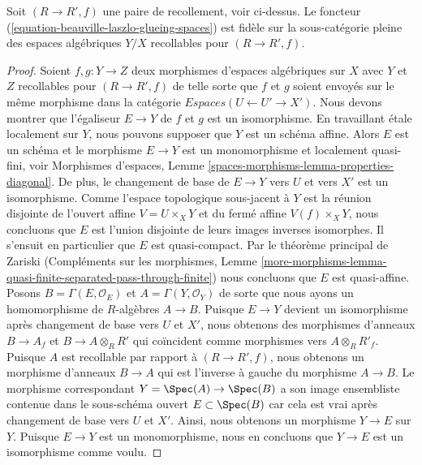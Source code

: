 \begin{lemma}
\label{lemma-glueing-f}
Soit $(R \to R', f)$ une paire de recollement, voir ci-dessus.
Le foncteur (\ref{equation-beauville-laszlo-glueing-spaces})
est fidèle sur la sous-catégorie pleine des
espaces algébriques $Y/X$ recollables pour $(R \to R', f)$.
\end{lemma}

\begin{proof}
Soient $f, g : Y \to Z$ deux morphismes d'espaces algébriques sur $X$
avec $Y$ et $Z$ recollables pour $(R \to R', f)$ de telle sorte que $f$ et $g$ soient envoyés
sur le même morphisme dans la catégorie $\textit{Espaces}(U \leftarrow U' \to X')$.
Nous devons montrer que l'égaliseur $E \to Y$ de $f$ et $g$ est un isomorphisme.
En travaillant \'etale localement sur $Y$, nous pouvons supposer que $Y$ est un schéma affine.
Alors $E$ est un schéma et le morphisme $E \to Y$ est un monomorphisme
et localement quasi-fini, voir Morphismes d'espaces, Lemme
\ref{spaces-morphisms-lemma-properties-diagonal}.
De plus, le changement de base de $E \to Y$ vers $U$ et vers $X'$ est
un isomorphisme. Comme l'espace topologique sous-jacent à $Y$ est la réunion disjointe de l'ouvert affine
$V = U \times_X Y$ et du fermé affine $V(f) \times_X Y$, nous concluons que $E$ est l'union disjointe de leurs images inverses isomorphes.  
Il s'ensuit en particulier que $E$ est quasi-compact.  
Par le théorème principal de Zariski (Compléments sur les morphismes, Lemme \ref{more-morphisms-lemma-quasi-finite-separated-pass-through-finite})  
nous concluons que $E$ est quasi-affine.  
Posons $B = \Gamma(E, \mathcal{O}_E)$ et $A = \Gamma(Y, \mathcal{O}_Y)$  
de sorte que nous ayons un homomorphisme de $R$-algèbres $A \to B$.  
Puisque $E \to Y$ devient un isomorphisme après changement de base vers $U$ et $X'$,  
nous obtenons des morphismes d'anneaux $B \to A_f$ et $B \to A \otimes_R R'$  
qui coïncident comme morphismes vers $A \otimes_R R'_f$. Puisque $A$ est recollable  
par rapport à $(R \to R', f)$, nous obtenons un morphisme d'anneaux $B \to A$ qui est l'inverse à gauche  
du morphisme $A \to B$. Le morphisme correspondant $Y = \Spec(A) \to \Spec(B)$  
a son image ensembliste contenue dans le sous-schéma ouvert $E \subset \Spec(B)$ car  
cela est vrai après changement de base vers $U$ et $X'$. Ainsi, nous obtenons un morphisme $Y \to E$ sur $Y$. Puisque $E \to Y$ est un monomorphisme, nous en concluons que $Y \to E$ est un isomorphisme comme voulu. 
\end{proof}

